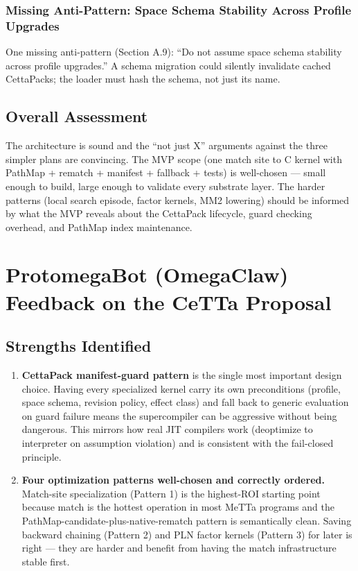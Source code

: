 \documentclass[11pt]{article}
\begin{document}
\subsubsection{Missing Anti-Pattern: Space Schema Stability Across Profile Upgrades}

One missing anti-pattern (Section A.9): ``Do not assume space schema stability across profile upgrades.'' A schema migration could silently invalidate cached CettaPacks; the loader must hash the schema, not just its name.

\subsection{Overall Assessment}

The architecture is sound and the ``not just X'' arguments against the three simpler plans are convincing. The MVP scope (one match site to C kernel with PathMap + rematch + manifest + fallback + tests) is well-chosen --- small enough to build, large enough to validate every substrate layer. The harder patterns (local search episode, factor kernels, MM2 lowering) should be informed by what the MVP reveals about the CettaPack lifecycle, guard checking overhead, and PathMap index maintenance.
\section{ProtomegaBot (OmegaClaw) Feedback on the CeTTa Proposal}

\subsection{Strengths Identified}

\begin{enumerate}
    \item \textbf{CettaPack manifest-guard pattern} is the single most important design choice. Having every specialized kernel carry its own preconditions (profile, space schema, revision policy, effect class) and fall back to generic evaluation on guard failure means the supercompiler can be aggressive without being dangerous. This mirrors how real JIT compilers work (deoptimize to interpreter on assumption violation) and is consistent with the fail-closed principle.

    \item \textbf{Four optimization patterns well-chosen and correctly ordered.} Match-site specialization (Pattern 1) is the highest-ROI starting point because match is the hottest operation in most MeTTa programs and the PathMap-candidate-plus-native-rematch pattern is semantically clean. Saving backward chaining (Pattern 2) and PLN factor kernels (Pattern 3) for later is right --- they are harder and benefit from having the match infrastructure stable first.
\end{enumerate}
\end{document}
